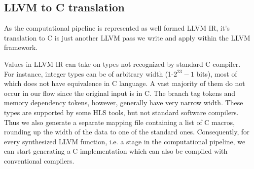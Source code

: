 
\subsection{LLVM to C translation}
As the computational pipeline is represented as well formed LLVM IR, it's translation to C is just another LLVM pass we write and apply within the LLVM framework. 


Values in LLVM IR can take on types not recognized by standard C compiler.
For instance, integer types can be of arbitrary width (1-$2^{23}-1$ bits), most of which does not have equivalence in C language. A vast majority of them do not occur
in our flow since the original input is in C. The branch tag tokens and memory
dependency tokens, however, generally have very narrow width. These types
are supported by some HLS tools, but not standard software compilers. Thus we also generate a separate mapping file containing a list of C macros, rounding up the width of the data to one of the standard ones. Consequently, for every synthesized LLVM function, i.e. a stage in the computational pipeline, we can start generating a C implementation which can also be compiled with conventional compilers.

